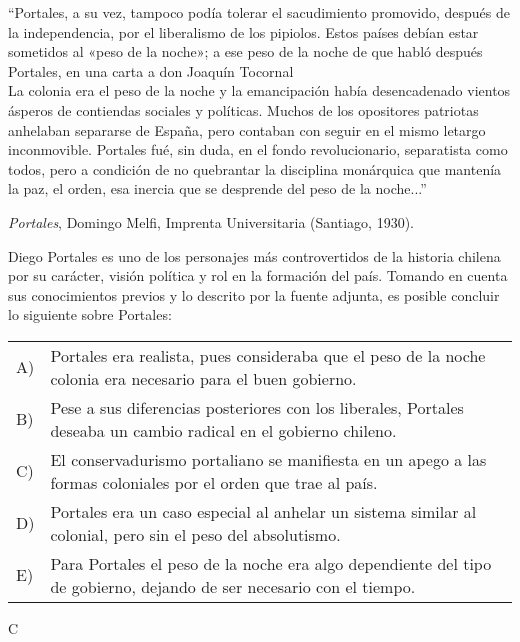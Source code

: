 \documentclass[letterpaper,11pt]{article}
\newcommand{\anchopregunta}{0.9\textwidth}
\begin{document}
\begin{enumerate}
\begin{minipage}{\anchopregunta}
\item ``Portales, a su vez, tampoco podía tolerar el sacudimiento promovido, después de la independencia, por el liberalismo de los pipiolos. Estos países debían estar sometidos al «peso de la noche»; a ese peso de la noche de que habló después Portales, en una carta a don Joaquín Tocornal\\La colonia era el peso de la noche y la emancipación había desencadenado vientos ásperos de contiendas sociales y políticas. Muchos de los opositores patriotas anhelaban separarse de España, pero contaban con seguir en el mismo letargo inconmovible. Portales fué, sin duda, en el fondo revolucionario, separatista como todos, pero a condición de no quebrantar la disciplina monárquica que mantenía la paz, el orden, esa inercia que se desprende del peso de la noche...''\\
\begin{flushright}
\textit{Portales}, Domingo Melfi, Imprenta Universitaria (Santiago, 1930).
\end{flushright}
Diego Portales es uno de los personajes más controvertidos de la historia chilena por su carácter, visión política y rol en la formación del país. Tomando en cuenta sus conocimientos previos y lo descrito por la fuente adjunta, es posible concluir lo siguiente sobre Portales:
\begin{flushleft}\begin{tabular}{@{\hspace{-.001\textwidth}}l@{\hspace{2pt}}p{}}
A)& Portales era realista, pues consideraba que el peso de la noche colonia era necesario para el buen gobierno.\\
B)& Pese a sus diferencias posteriores con los liberales, Portales deseaba un cambio radical en el gobierno chileno.\\
C)& El conservadurismo portaliano se manifiesta en un apego a las formas coloniales por el orden que trae al país.\\
D)& Portales era un caso especial al anhelar un sistema similar al colonial, pero sin el peso del absolutismo.\\
E)& Para Portales el peso de la noche era algo dependiente del tipo de gobierno, dejando de ser necesario con el tiempo.\\ 
\end{tabular}\end{flushleft}%
\begin{key} C

\end{key}
\end{minipage}
\end{enumerate}
\end{document}
